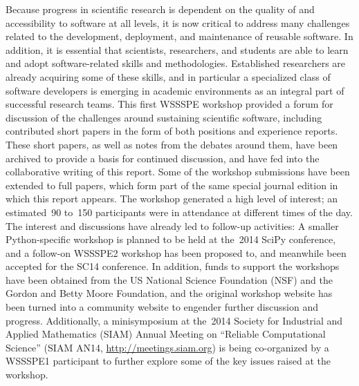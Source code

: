 \documentclass[11pt, oneside]{amsart}
\newcommand{\note}[1]{ {\textcolor{red}    { #1 }}}
\begin{document}
Because progress in scientific research is dependent on the quality of and
accessibility to software at all levels, it is now critical to address many
challenges related to the development, deployment, and maintenance of reusable
software.
In addition, it is essential that scientists,
researchers, and students are able to learn and adopt software-related skills
and methodologies. Established researchers are already acquiring some of these
skills, and in particular a specialized class of software developers is
emerging in academic environments as an integral part of
successful research teams. This first WSSSPE workshop  provided a forum
for discussion of the challenges around sustaining scientific software, including
contributed short papers in the form of both positions and experience
reports. These short papers, as well as notes from the debates around
them, have been archived to provide a basis for continued
discussion, and have fed into the collaborative writing of this
report.  Some of the workshop submissions have been extended to full
papers, which form part of the same special journal edition in which this report
appears. The workshop generated a high level of interest; an
estimated~90 to~150 participants were in attendance at different times
of the day. The interest and discussions have already led to follow-up activities:
A smaller Python-specific workshop is planned to be held at the~2014
SciPy conference, and a follow-on WSSSPE2 workshop has been proposed
to, and meanwhile been
accepted for the SC14 conference. In addition, 
funds to support the workshops have been obtained from
the US National Science Foundation (NSF) and the Gordon and Betty Moore
Foundation, and the
original workshop website has been turned into a community website to engender
further discussion and progress. Additionally, a minisymposium  at the~2014 Society for Industrial and Applied Mathematics
(SIAM) Annual Meeting on ``Reliable
Computational Science'' (SIAM AN14, \url{http://meetings.siam.org})  is being co-organized by a
WSSSPE1 participant to
further explore some of the key issues raised at the workshop.
\end{document}
